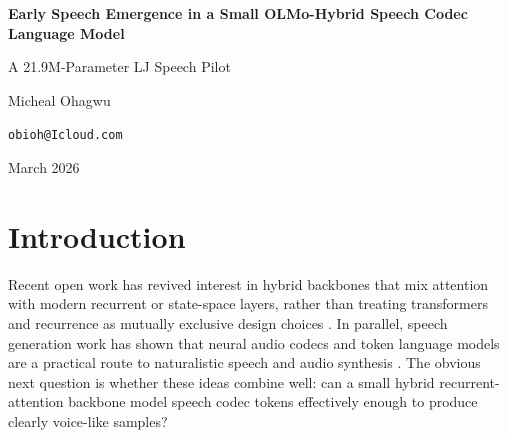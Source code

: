 \documentclass[11pt]{article}
\begin{document}
\begin{center}
{\LARGE\bfseries Early Speech Emergence in a Small OLMo-Hybrid Speech Codec Language Model\par}
\vspace{0.35em}
{\large A 21.9M-Parameter LJ Speech Pilot\par}
\vspace{0.9em}
{\normalsize Micheal Ohagwu\par}
{\small \texttt{obioh@Icloud.com}\par}
\vspace{0.2em}
{\small March 2026\par}
\end{center}

\vspace{0.4em}

\begin{abstract}
We study whether a small OLMo-Hybrid-style recurrent-attention language model can learn speech codec structure well enough to produce clearly voice-like audio, without text conditioning, on a clean single-speaker corpus. The model operates over 8-codebook EnCodec 24~kHz tokens extracted from LJ Speech and uses an 8-layer decoder with a 3:1 recurrent-to-attention schedule, yielding 6 Gated DeltaNet blocks and 2 attention blocks for a total of 21.9M parameters. On an NVIDIA A100-SXM4-80GB, the best locally preserved checkpoint reached an EMA validation loss of 4.2847 and perplexity 72.58 at step 1800, before pod failure interrupted the run near the step-2000 boundary. Direct listening to fixed-prompt local samples from steps 1200, 1400, 1600, and 1800 showed a clear speaking timbre and speech-like local structure, with failures dominated by babble and weak articulation rather than static, drone noise, or codec collapse. The stable run did not use the intended fused Flash Linear Attention Gated DeltaNet kernel due upstream Triton/kernel failures, so the reported systems performance is conservative relative to the architecture's intended fast path. We present this result as a pilot study: not a benchmark claim, but evidence that an OLMo-Hybrid / Gated-DeltaNet-style backbone is a viable speech codec language model at small scale.
\end{abstract}

\section{Introduction}
Recent open work has revived interest in hybrid backbones that mix attention with modern recurrent or state-space layers, rather than treating transformers and recurrence as mutually exclusive design choices \citep{merrill2026olmohybrid, yang2024gateddeltanet}. In parallel, speech generation work has shown that neural audio codecs and token language models are a practical route to naturalistic speech and audio synthesis \citep{borsos2022audiolm, defossez2022encodec, wang2023valle, zhang2023speechtokenizer}. The obvious next question is whether these ideas combine well: can a small hybrid recurrent-attention backbone model speech codec tokens effectively enough to produce clearly voice-like samples?
\end{document}

